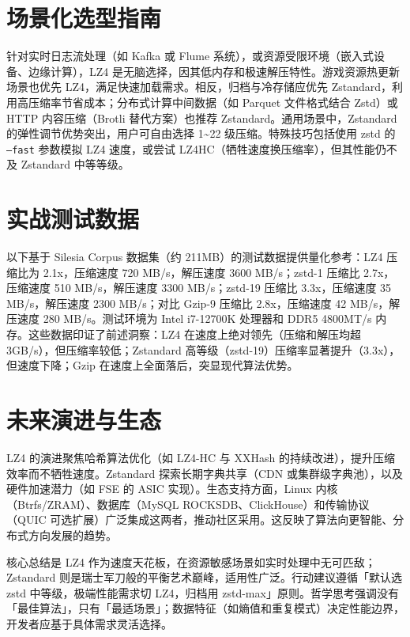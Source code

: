 \chapter{场景化选型指南}
针对实时日志流处理（如 Kafka 或 Flume 系统），或资源受限环境（嵌入式设备、边缘计算），LZ4 是无脑选择，因其低内存和极速解压特性。游戏资源热更新场景也优先 LZ4，满足快速加载需求。相反，归档与冷存储应优先 Zstandard，利用高压缩率节省成本；分布式计算中间数据（如 Parquet 文件格式结合 Zstd）或 HTTP 内容压缩（Brotli 替代方案）也推荐 Zstandard。通用场景中，Zstandard 的弹性调节优势突出，用户可自由选择 1\~{}22 级压缩。特殊技巧包括使用 zstd 的 \texttt{--fast} 参数模拟 LZ4 速度，或尝试 LZ4HC（牺牲速度换压缩率），但其性能仍不及 Zstandard 中等等级。\par
\chapter{实战测试数据}
以下基于 Silesia Corpus 数据集（约 211MB）的测试数据提供量化参考：LZ4 压缩比为 2.1x，压缩速度 720 MB/s，解压速度 3600 MB/s；zstd-1 压缩比 2.7x，压缩速度 510 MB/s，解压速度 3300 MB/s；zstd-19 压缩比 3.3x，压缩速度 35 MB/s，解压速度 2300 MB/s；对比 Gzip-9 压缩比 2.8x，压缩速度 42 MB/s，解压速度 280 MB/s。测试环境为 Intel i7-12700K 处理器和 DDR5 4800MT/s 内存。这些数据印证了前述洞察：LZ4 在速度上绝对领先（压缩和解压均超 3GB/s），但压缩率较低；Zstandard 高等级（zstd-19）压缩率显著提升（3.3x），但速度下降；Gzip 在速度上全面落后，突显现代算法优势。\par
\chapter{未来演进与生态}
LZ4 的演进聚焦哈希算法优化（如 LZ4-HC 与 XXHash 的持续改进），提升压缩效率而不牺牲速度。Zstandard 探索长期字典共享（CDN 或集群级字典池），以及硬件加速潜力（如 FSE 的 ASIC 实现）。生态支持方面，Linux 内核（Btrfs/ZRAM）、数据库（MySQL ROCKSDB、ClickHouse）和传输协议（QUIC 可选扩展）广泛集成这两者，推动社区采用。这反映了算法向更智能、分布式方向发展的趋势。\par
核心总结是 LZ4 作为速度天花板，在资源敏感场景如实时处理中无可匹敌；Zstandard 则是瑞士军刀般的平衡艺术巅峰，适用性广泛。行动建议遵循「默认选 zstd 中等级，极端性能需求切 LZ4，归档用 zstd-max」原则。哲学思考强调没有「最佳算法」，只有「最适场景」；数据特征（如熵值和重复模式）决定性能边界，开发者应基于具体需求灵活选择。\par
